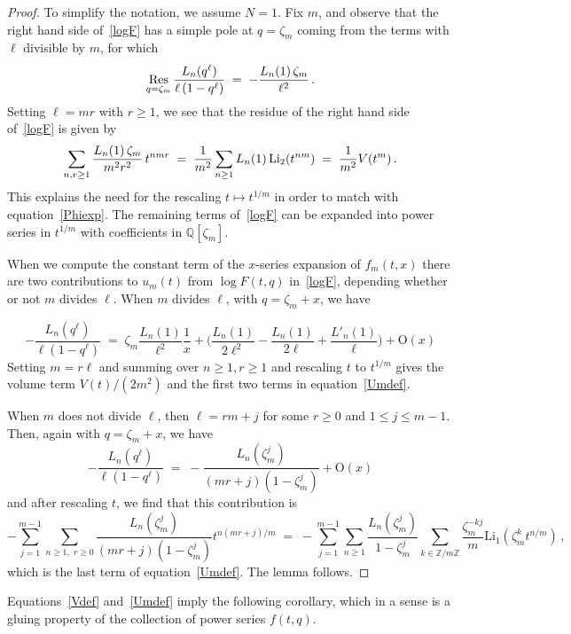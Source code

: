 \documentclass[12pt,reqno]{amsart}
\theoremstyle{definition}
\def\BZ{\mathbb Z}
\def\BQ{\mathbb Q}
\def\Res#1{\underset{#1}{\mathrm{Res}}\,}
\def\Li{\mathrm{Li}}
\def\be{\begin{equation}}
\def\ee{\end{equation}}
\def\z{\zeta}
\def\={\;=\;}
\def\Phitof{f}
\begin{document}
\begin{proof}
To simplify the notation, we assume $N=1$.
Fix $m$, and observe that the right hand side of~\eqref{logF}
has a simple pole at $q=\z_m$ coming from the terms with $\ell$ divisible by $m$,
for which
\be
\Res{q=\z_m} \frac{L_n(q^{\ell})}{\ell\thinspace(1-q^{\ell})}
\= -\frac{L_n(1)\thinspace\z_m}{\ell^2} \,.
\ee
Setting $\ell=mr$ with $r \geq 1$, we see that the residue of the right hand
side of~\eqref{logF} is given by
\be
\sum_{n, r \geq 1} \frac{L_n(1)\thinspace \z_m}{m^2 r^2}\thinspace t^{n m r} \=
\frac{1}{m^2} \sum_{n \geq 1} L_n(1)\thinspace \Li_2(t^{n m})
\= \frac{1}{m^2} V(t^m) \,.
\ee
This explains the need for the rescaling $t \mapsto t^{1/m}$ in order to 
match with equation~\eqref{Phiexp}. The remaining terms of~\eqref{logF} 
can be expanded into power series in $t^{1/m}$ with coefficients in $\BQ[\z_m]$. 

When we compute the constant term of the $x$-series expansion of $\Phitof_m(t,x)$
there are two contributions to $u_m(t)$ %
from $\log F(t,q)$ in~\eqref{logF}, depending whether or not $m$ divides $\ell$.
When $m$ divides $\ell$, with $q=\z_m+x$, we have


\be
\label{uptox}
- \frac{L_n(q^\ell)}{\ell(1-q^\ell)} \= \z_m \frac{L_n(1)}{\ell^2} \frac{1}{x} +
\Big( \frac{L_n(1)}{2\ell^2} - \frac{L_n(1)}{2 \ell} + \frac{L'_n(1)}{\ell} \Big)
+ \mathrm{O}(x)
\ee
Setting $m=r \ell$ and summing over $n \geq 1, r \geq 1$ and rescaling
$t$ to $t^{1/m}$ gives the volume term $V(t)/(2 m^2)$ and the first two terms
in equation~\eqref{Umdef}.

When $m$ does not divide $\ell$, then $\ell=rm+j$ for some $r \geq 0$ and
$1 \leq j \leq m-1$. Then, again with $q=\z_m+x$, we have
\be
- \frac{L_n(q^\ell)}{\ell(1-q^\ell)} \= -\frac{L_n(\z_m^j)}{(mr+j)(1-\z_m^j)}
+ \mathrm{O}(x) 
\ee
and after rescaling $t$, we find that this contribution is
\be
-\sum_{j=1}^{m-1} \sum_{n \geq1, \,\, r \geq 0}
\frac{L_n(\z_m^j)}{(mr+j)(1-\z_m^j)} t^{n(mr+j)/m} \=
-\sum_{j=1}^{m-1} \sum_{n \geq 1} \frac{L_n(\z_m^j)}{1-\z_m^j}
\sum_{k\in\BZ/m\BZ}
\frac{\z_m^{-kj}}{m}
\Li_{1}(\z_m^{k}t^{n/m})\,,
\ee
which is the last term of equation~\eqref{Umdef}.
The lemma follows.
\end{proof}

Equations~\eqref{Vdef} and~\eqref{Umdef} imply the following corollary, which in
a sense is a gluing property of the collection of power series $\Phitof(t,q)$. 
\end{document}
